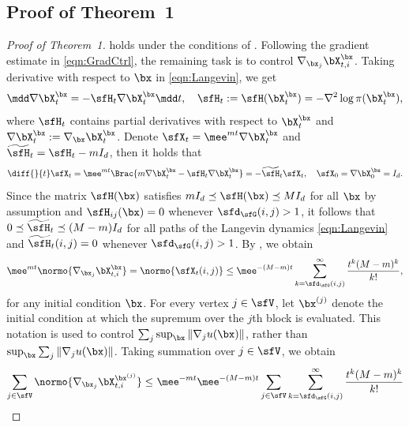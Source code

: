\documentclass[11pt]{article}
\begin{document}
\subsection{Proof of Theorem~1}
\label{app:thm_MRF_loc}

\begin{proof}[Proof of Theorem~1]

 holds under the conditions of . Following the gradient estimate in \eqref{eqn:GradCtrl}, the remaining task is to control $\nabla_{\bx_j} \bX_{t,i}^\bx$.
Taking derivative with respect to $\bx$ in \eqref{eqn:Langevin}, we get
\begin{equation}
\label{eqn:pf_dXEvol}
    \mdd \nabla \bX_t^\bx = - \sfH_t  \nabla \bX_t^\bx \mdd t, \quad \sfH_t := \sfH(\bX_t^\bx) = - \nabla^2 \log \pi(\bX_t^\bx),
\end{equation}
where $\sfH_t$ contains partial derivatives with respect to  $\bX_t^\bx$ and $\nabla \bX_t^\bx := \nabla_\bx \bX_t^\bx$.
%
Denote $\sfX_t = \mee^{mt} \nabla \bX_t^\bx$ and $\widetilde{\sfH}_t = \sfH_t - m I_d $, then it holds that
\begin{equation}
    \diff{}{t} \sfX_t = \mee^{mt} \Brac{ m \nabla \bX_t^\bx - \sfH_t \nabla \bX_t^\bx } = - \widetilde{\sfH}_t \sfX_t, \quad \sfX_0 = \nabla \bX_0^\bx = I_d.
\end{equation}
Since the matrix $\sfH(\bx)$ satisfies $m I_d \preceq \sfH(\bx) \preceq M I_d$ for all $\bx$ by assumption and $\sfH_{ij}(\bx) = 0$ whenever $\sfd_{\sfG}(i,j)>1$, it follows that $0 \preceq \widetilde{\sfH}_{t} \preceq (M-m)I_d$ for all paths of the Langevin dynamics \eqref{eqn:Langevin} and $\widetilde{\sfH}_{t}(i,j) = 0$ whenever $\sfd_{\sfG}(i,j)>1$.
By , we obtain
\begin{equation}
\label{eqn:pf_dXGrad}
    \mee^{mt} \normo{ \nabla_{\bx_j} \bX_{t,i}^\bx } = \normo{ \sfX_{t}(i,j) } \le \mee^{-(M-m) t} \sum_{k=\sfd_\sfG(i,j)}^\infty \frac{t^k(M-m)^k}{k!},
\end{equation}
for any initial condition $\bx$. For every vertex $j\in \sfV$, let $\bx^{(j)}$ denote the initial condition at which the supremum over the $j$th block is evaluated. This notation is used to control $\sum_j \sup_{\bx}\|\nabla_j u(\bx)\|$, rather than $\sup_{\bx}\sum_j \|\nabla_j u(\bx)\|$. Taking summation over $j\in \sfV$, we obtain
\begin{equation}
\begin{split}
    \sum_{j\in \sfV} \normo{ \nabla_{\bx_j} \bX_{t,i}^{\bx^{(j)}} } \le~& \mee^{-mt} \mee^{-(M-m) t} \sum_{j\in \sfV} \sum_{ k = \sfd_\sfG(i,j) }^\infty \frac{t^k(M-m)^k}{k!} \\

\end{split}
\end{equation}
\end{proof}
\end{document}
